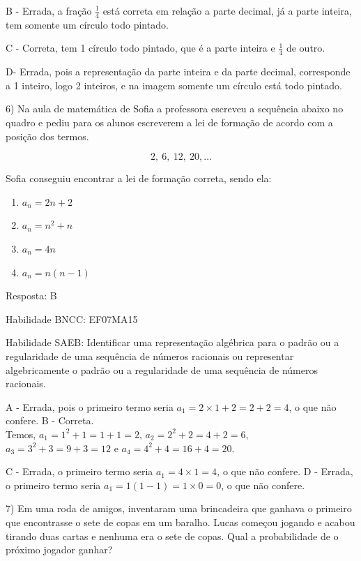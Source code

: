B - Errada, a fração \(\frac{1}{4}\) está correta em relação a parte
decimal, já a parte inteira, tem somente um círculo todo pintado.

C - Correta, tem 1 círculo todo pintado, que é a parte inteira e
\(\frac{1}{4}\) de outro.

D- Errada, pois a representação da parte inteira e da parte decimal,
corresponde a 1 inteiro, logo 2 inteiros, e na imagem somente um círculo
está todo pintado.

6) Na aula de matemática de Sofia a professora escreveu a sequência
abaixo no quadro e pediu para os alunos escreverem a lei de formação de
acordo com a posição dos termos.

\[2,\ 6,\ 12,\ 20,\ldots\]

Sofia conseguiu encontrar a lei de formação correta, sendo ela:

\begin{enumerate}
\def\labelenumi{\alph{enumi})}
\item
  \(a_{n} = 2n + 2\)
\item
  \(a_{n} = n^2 + n\)
\item
  \(a_{n} = 4n\)
\item
  \(a_{n} = n(n - 1)\)
\end{enumerate}

Resposta: B

Habilidade BNCC: EF07MA15

Habilidade SAEB: Identificar uma representação algébrica para o padrão
ou a regularidade de uma sequência de números racionais ou representar
algebricamente o padrão ou a regularidade de uma sequência de números
racionais.

A - Errada, pois o primeiro termo seria
\(a_{1} = 2 \times 1 + 2 = 2 + 2 = 4\), o que não confere. B -
Correta.\\
Temos, \(a_{1} = 1^{2} + 1 = 1 + 1 = 2\),
\(a_{2} = 2^{2} + 2 = 4 + 2 = 6\), \(a_{3} = 3^{2} + 3 = 9 + 3 = 12\) e
\(a_{4} = 4^2 + 4 = 16 + 4 = 20\).

C - Errada, o primeiro termo seria \(a_{1} = 4 \times 1 = 4\)\emph{,} o
que não confere.\emph{\hfill\break
}D - Errada, o primeiro termo seria
\(a_{1} = 1\left( 1 - 1 \right) = 1 \times 0 = 0\), o que não confere.

7) Em uma roda de amigos, inventaram uma brincadeira que ganhava o
primeiro que encontrasse o sete de copas em um baralho. Lucas começou
jogando e acabou tirando duas cartas e nenhuma era o sete de copas. Qual
a probabilidade de o próximo jogador ganhar?

